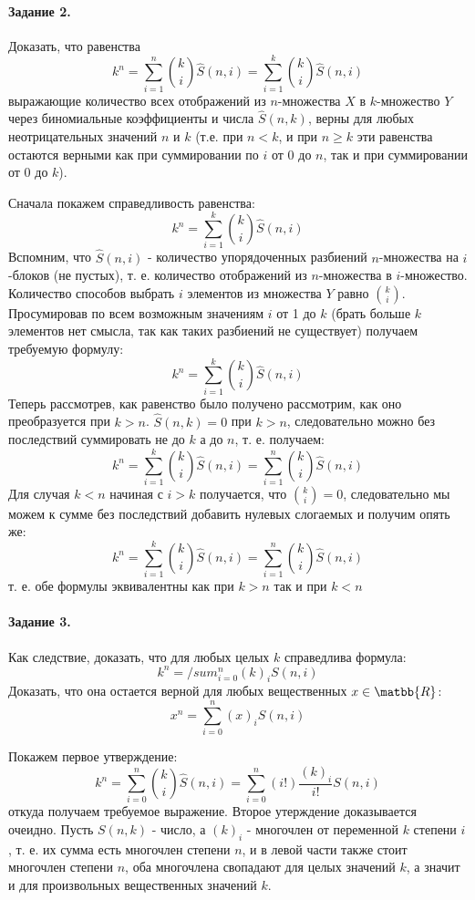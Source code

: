 \documentclass[a4paper,12pt]{article}
\begin{document}
\paragraph{Задание 2.} Доказать, что равенства
\[
	k^n=\sum_{i=1}^n \binom{k}{i} \hat S \left(n,i\right) = \sum_{i=1}^k \binom{k}{i} \hat S \left(n,i\right)
\]
выражающие количество всех отображений из $n$-множества $X$ в $k$-множество $Y$ через биномиальные коэффициенты и числа $\hat S \left(n,k\right)$, верны для любых неотрицательных значений $n$ и $k$ (т.е. при $n<k$, и при $n\ge k$ эти равенства остаются верными как при суммировании по $i$ от 0 до $n$, так и при суммировании от 0 до $k$).

\begin{Proof}
Сначала покажем справедливость равенства:
\[
	k^n = \sum_{i=1}^k \binom{k}{i} \hat S \left(n,i\right)
\]
Вспомним, что $\hat S \left(n,i\right)$ - количество упорядоченных разбиений $n$-множества на $i$-блоков (не пустых), т. е. количество отображений из $n$-множества в $i$-множество. Количество способов выбрать $i$ элементов из множества $Y$ равно $\binom{k}{i}$. Просумировав по всем возможным значениям $i$ от 1 до $k$ (брать больше $k$ элементов нет смысла, так как таких разбиений не существует) получаем требуемую формулу:
\[
	k^n = \sum_{i=1}^k \binom{k}{i} \hat S \left(n,i\right)
\]
Теперь рассмотрев, как равенство было получено рассмотрим, как оно преобразуется при $k>n$. $\hat S \left(n,k\right) = 0$ при $k>n$, следовательно можно без последствий суммировать не до $k$ а до $n$, т. е. получаем:
\[
	k^n = \sum_{i=1}^k \binom{k}{i} \hat S \left(n,i\right) = \sum_{i=1}^n \binom{k}{i} \hat S \left(n,i\right)
\]
Для случая $k < n$ начиная с $i > k$ получается, что $\binom{k}{i} = 0$, следовательно мы можем к сумме без последствий добавить нулевых слогаемых и получим опять же:
\[
	k^n = \sum_{i=1}^k \binom{k}{i} \hat S \left(n,i\right) = \sum_{i=1}^n \binom{k}{i} \hat S \left(n,i\right)
\]
т. е. обе формулы эквивалентны как при $k>n$ так и при $k<n$
\end{Proof}

\paragraph{Задание 3.} Как следствие, доказать, что для любых целых $k$ справедлива формула:
\[
	k^n = /sum_{i=0}^n \left(k\right)_i S \left(n,i\right)
\]
Доказать, что она остается верной для любых вещественных $x \in \matbb{R}$:
\[
	x^n = \sum_{i=0}^n \left(x\right)_i S \left(n,i\right)
\]
\begin{Proof}
Покажем первое утверждение:
\[
	k^n = \sum_{i=0}^n \binom{k}{i} \hat S \left(n,i\right) = \sum_{i=0}^n \left(i!\right) \frac{\left(k\right)_i}{i!} S \left(n,i\right)
\]
откуда получаем требуемое выражение. Второе утерждение доказывается очеидно. Пусть $S \left(n,k\right)$ - число, а $\left(k\right)_i$ - многочлен от переменной $k$ степени $i$, т. е. их сумма есть многочлен степени $n$, и в левой части также стоит многочлен степени $n$, оба многочлена свопадают для целых значений $k$, а значит и для произвольных вещественных значений $k$.
\end{Proof}
\end{document}

